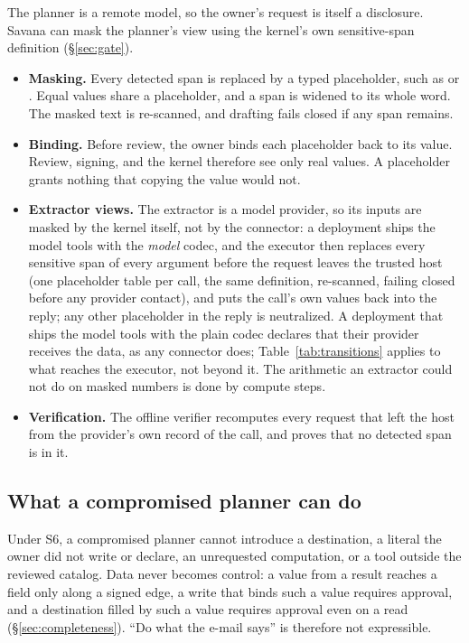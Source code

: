 \documentclass[letterpaper,twocolumn,10pt]{article}
\newcommand{\sys}{Savana}
\newcommand{\code}[1]{\texttt{\detokenize{#1}}}
\begin{document}
The planner is a remote model, so the owner's request is itself a
disclosure. \sys{} can mask the planner's view using the kernel's own
sensitive-span definition (\S\ref{sec:gate}).
\begin{itemize}
\item \textbf{Masking.} Every detected span is replaced by a typed
  placeholder, such as \code{<EMAIL_1>} or \code{<PERSONAL_DATA_1>}. Equal
  values share a placeholder, and a span is widened to its whole word. The
  masked text is re-scanned, and drafting fails closed if any span remains.
\item \textbf{Binding.} Before review, the owner binds each placeholder
  back to its value. Review, signing, and the kernel therefore see only
  real values. A placeholder grants nothing that copying the value would
  not.
\item \textbf{Extractor views.} The extractor is a model provider, so its
  inputs are masked by the kernel itself, not by the connector: a
  deployment ships the model tools with the \emph{model} codec, and the
  executor then replaces every sensitive span of every argument before the
  request leaves the trusted host (one placeholder table per call, the
  same definition, re-scanned, failing closed before any provider contact),
  and puts the call's own values back into the reply; any other
  placeholder in the reply is neutralized. A deployment that ships the
  model tools with the plain codec declares that their provider receives
  the data, as any connector does; Table~\ref{tab:transitions} applies to
  what reaches the executor, not beyond it. The arithmetic an extractor
  could not do on masked numbers is done by compute steps.
\item \textbf{Verification.} The offline verifier recomputes every request
  that left the host from the provider's own record of the call, and
  proves that no detected span is in it.
\end{itemize}

\subsection{What a compromised planner can do}
\label{sec:planner-residue}

Under S6, a compromised planner cannot introduce a destination, a literal
the owner did not write or declare, an unrequested computation, or a tool
outside the reviewed catalog. Data never becomes control: a value from a
result reaches a field only along a signed edge, a write that binds such a
value requires approval, and a destination filled by such a value requires
approval even on a read (\S\ref{sec:completeness}). ``Do what the e-mail
says'' is therefore not expressible.
\end{document}
